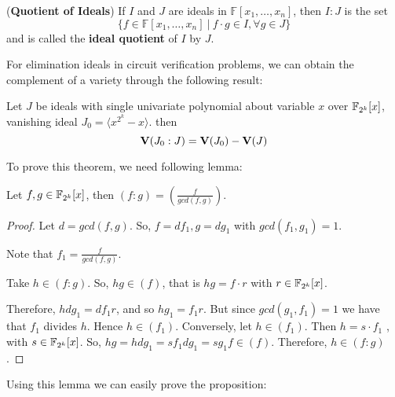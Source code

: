 \begin{Definition}
({\bf Quotient of Ideals}) If $I$ and $J$ are ideals in $\mathbb
  F[x_1, \dots, x_n]$, then $I:J$ is the set
  \begin{equation}
  \{f \in \mathbb F[x_1, \dots, x_n]\ |\ f\cdot g \in I, \forall g \in J\}\nonumber
  \end{equation}
and is called the {\bf ideal quotient} of $I$ by $J$.
\end{Definition}



For elimination ideals in circuit verification problems, we can obtain
the complement of a variety through the following result:

\begin{Theorem}
\label{thm:quotient}
Let $J$ be ideals with single univariate polynomial about variable $x$ over ${\mathbb{F}}_{2^k}[x]$, vanishing ideal $J_0 = \langle x^{2^k}-x\rangle$. then 
$${\bf V}(J_0:J) = {\bf V}(J_0) - {\bf V}(J)$$
\end{Theorem}

To prove this theorem, we need following lemma:
\begin{Lemma}
\label{lem:gcd}
Let $f,g\in {\mathbb{F}}_{2^k}[x]$, then $(f:g) = \left(\frac{f}{gcd(f,g)}\right)$.
\end{Lemma}

\begin{proof}
Let $d = gcd(f, g)$. So, $f = df_1 , g = dg_1$ with $gcd(f_1 , g_1 ) = 1$.

Note that $f_1 = \frac{f}{gcd(f,g)}$.

Take $h \in (f : g)$. So, $hg \in (f )$, that is $hg = f \cdot r$ with $r \in {\mathbb{F}}_{2^k}[x]$.

Therefore, $hdg_1 = df_1 r$, and so $hg_1 = f_1 r$. But since $gcd(g_1 , f_1 ) = 1$ we have that $f_1$
divides $h$. Hence $h \in (f_1 )$.
Conversely, let $h \in (f_1 )$. Then $h = s \cdot f_1$ , with $s \in {\mathbb{F}}_{2^k}[x]$. So, $hg = hdg_1 = sf_1 dg_1 = sg_1 f \in
(f )$. Therefore, $h \in (f : g)$.
\end{proof}
Using this lemma we can easily prove the proposition:

